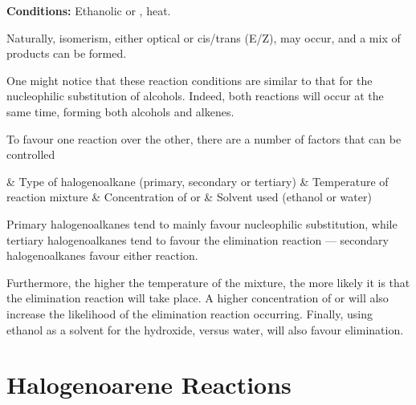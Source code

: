 			\vspace{1.5em}
			\vbox{\textbf{Conditions:}	\tabto{35mm}Ethanolic  or , heat.}


			Naturally, isomerism, either optical or cis/trans (E/Z), may occur, and a mix of products can be formed.

			One might notice that these reaction conditions are similar to that for the nucleophilic substitution of alcohols. Indeed,
			both reactions will occur at the same time, forming both alcohols and alkenes.

			To favour one reaction over the other, there are a number of factors that can be controlled

			\begin{bulletlist}
				& Type of halogenoalkane (primary, secondary or tertiary)
				& Temperature of reaction mixture
				& Concentration of  or 
				& Solvent used (ethanol or water)
			\end{bulletlist}

			Primary halogenoalkanes tend to mainly favour nucleophilic substitution, while tertiary halogenoalkanes tend to favour the
			elimination reaction --- secondary halogenoalkanes favour either reaction.

			Furthermore, the higher the temperature of the mixture, the more likely it is that the elimination reaction will take place.
			A higher concentration of  or  will also increase the likelihood of the elimination reaction occurring.
			Finally, using ethanol as a solvent for the hydroxide, versus water, will also favour elimination.



	\pagebreak
	\section{Halogenoarene Reactions}

